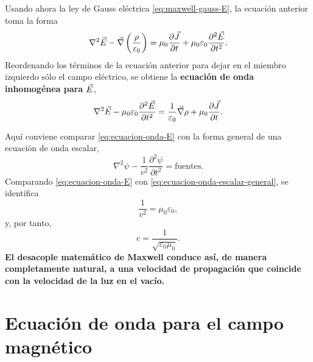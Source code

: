 \documentclass[../main.tex]{subfiles}
\begin{document}
Usando ahora la ley de Gauss eléctrica \eqref{eq:maxwell-gauss-E}, la ecuación anterior toma la forma
\begin{equation*}
  \nabla^2\vec E- \vec\nabla\left(\frac{\rho}{\varepsilon_0}\right)= \mu_0\frac{\partial\vec{J}}{\partial t}+\mu_0\varepsilon_0\frac{\partial^2\vec{E}}{\partial t^2}.
\end{equation*}
Reordenando los términos de la ecuación anterior para dejar en el miembro izquierdo sólo el campo eléctrico, se obtiene la \textbf{ecuación de onda inhomogénea para $\vec{E}$},
\begin{equation}
  \nabla^2\vec E- \mu_0\varepsilon_0\frac{\partial^2\vec{E}}{\partial t^2}=\frac{1}{\varepsilon_0}\vec\nabla \rho+\mu_0\frac{\partial\vec{J}}{\partial t}.
  \label{eq:ecuacion-onda-E}
\end{equation}

Aquí conviene comparar \eqref{eq:ecuacion-onda-E} con la forma general de una ecuación de onda escalar,
\begin{equation}
    \nabla^2\psi-\frac{1}{v^2}\frac{\partial^2\psi}{\partial t^2}=\text{fuentes}.
    \label{eq:ecuacion-onda-escalar-general}
\end{equation}
Comparando \eqref{eq:ecuacion-onda-E} con \eqref{eq:ecuacion-onda-escalar-general}, se identifica
\begin{equation*}
    \frac{1}{v^2}=\mu_0\varepsilon_0,
\end{equation*}
y, por tanto,
\begin{equation*}
    c=\frac{1}{\sqrt{\varepsilon_0 \mu_0}}.
\end{equation*}
\textbf{El desacople matemático de Maxwell conduce así, de manera completamente natural, a una velocidad de propagación que coincide con la velocidad de la luz en el vacío.}

\section{Ecuación de onda para el campo magnético}
\end{document}
